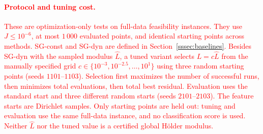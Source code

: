 \documentclass[]{interact}
\theoremstyle{plain}
\theoremstyle{definition}
\theoremstyle{remark}
\begin{document}
\paragraph*{\textcolor{red}{Protocol and tuning cost.}}
\leavevmode\textcolor{red}{These are optimization-only tests on full-data feasibility instances.
They use $J\le10^{-6}$, at most $1\,000$ evaluated points, and identical
starting points across methods. SG-const and SG-dyn are defined in Section~\ref{sssec:baselines}. Besides SG-dyn with the
sampled modulus $\widehat L$, a tuned variant selects $L=c\widehat L$ from the manually specified grid
$c\in\{10^{-3},10^{-2.5},\ldots,10^1\}$ using three random starting
points (seeds $1101$--$1103$). Selection first maximizes the number of
successful runs, then minimizes total evaluations, then total best residual.
Evaluation uses the standard start and three different random starts
(seeds $2101$--$2103$). The feature starts are Dirichlet samples.
Only starting points are held out: tuning and evaluation use the same
full-data instance, and no classification score is used. Neither
$\widehat L$ nor the tuned value is a certified global H\"older modulus.}
\end{document}
